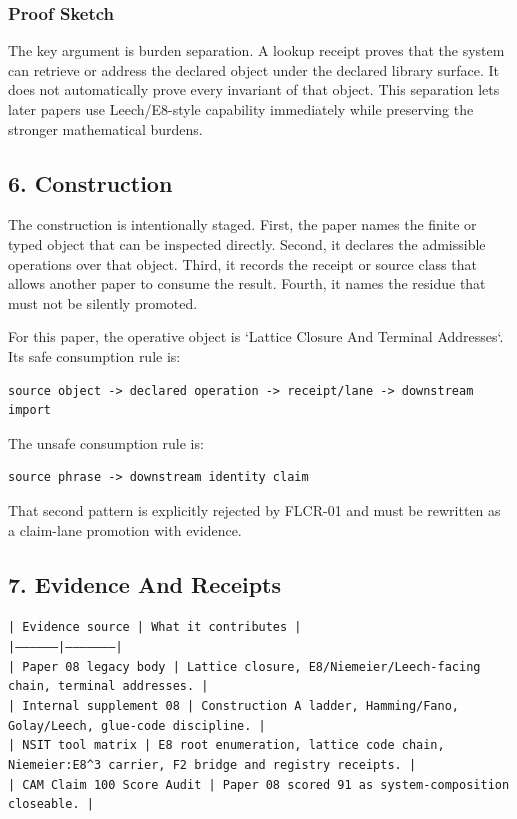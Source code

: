 \documentclass[11pt]{article}
\begin{document}
\subsubsection*{Proof Sketch}

The key argument is burden separation. A lookup receipt proves that the system can retrieve or address the declared object under the declared library surface. It does not automatically prove every invariant of that object. This separation lets later papers use Leech/E8-style capability immediately while preserving the stronger mathematical burdens.

\subsection*{6. Construction}

The construction is intentionally staged. First, the paper names the finite or
typed object that can be inspected directly. Second, it declares the admissible
operations over that object. Third, it records the receipt or source class that
allows another paper to consume the result. Fourth, it names the residue that
must not be silently promoted.

For this paper, the operative object is `Lattice Closure And Terminal Addresses`. Its safe consumption
rule is:

\begin{verbatim}
source object -> declared operation -> receipt/lane -> downstream import
\end{verbatim}

The unsafe consumption rule is:

\begin{verbatim}
source phrase -> downstream identity claim
\end{verbatim}

That second pattern is explicitly rejected by FLCR-01 and must be rewritten as
a claim-lane promotion with evidence.

\subsection*{7. Evidence And Receipts}

\noindent\texttt{| Evidence source | What it contributes |}\\
\noindent\texttt{|-----------------|---------------------|}\\
\noindent\texttt{| Paper 08 legacy body | Lattice closure, E8/Niemeier/Leech-facing chain, terminal addresses. |}\\
\noindent\texttt{| Internal supplement 08 | Construction A ladder, Hamming/Fano, Golay/Leech, glue-code discipline. |}\\
\noindent\texttt{| NSIT tool matrix | E8 root enumeration, lattice code chain, Niemeier:E8\textasciicircum{}3 carrier, F2 bridge and registry receipts. |}\\
\noindent\texttt{| CAM Claim 100 Score Audit | Paper 08 scored 91 as system-composition closeable. |}\\
\end{document}
